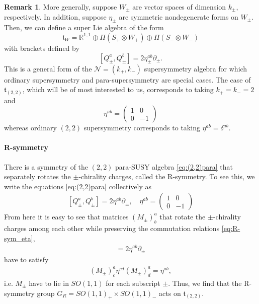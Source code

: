\documentclass[letterpaper,12pt]{article}
\newcommand{\RR}{\mathbb{R}}
\newcommand{\cN}{\mathcal{N}}
\newcommand{\p}{\partial}
\def\tl{\tilde}
\theoremstyle{definition}
\newtheorem{remark}[theorem]{Remark}
\theoremstyle{remark}
\theoremstyle{examples}
\begin{document}
\begin{remark}
\label{rmk: generalsusy}
More generally, suppose $W_\pm$ are vector spaces of dimension $k_\pm$, respectively.
In addition, suppose $\eta_\pm$ are symmetric nondegenerate forms on $W_\pm$. 
Then, we can define a super Lie algebra of the form
\[
\mathfrak{t}_{W} =  \RR^{1,1} \oplus \Pi(S_+ \otimes W_+) \oplus \Pi(S_- \otimes W_-)
\]
with brackets defined by
\[
[Q_\pm^{a}, Q_\pm^{b}] = 2 \eta^{ab}_\pm \partial_\pm .
\] 
This is a general form of the $\cN = (k_+, k_-)$ supersymmetry algebra for which ordinary supersymmetry and para-supersymmetry are special cases.
The case of $\mathfrak{t}_{(2,2)}$, which will be of most interested to us, corresponds to taking $k_+ = k_- = 2$ and 
\[
\eta^{ab}=\begin{pmatrix}
1 & 0 \\
0 & -1
\end{pmatrix}
\]
whereas ordinary $(2,2)$ supersymmetry corresponds to taking $\eta^{ab} = \delta^{ab}$. 

\end{remark}

\paragraph{R-symmetry}
There is a symmetry of the $(2,2)$ para-SUSY algebra \eqref{eq:(2,2)para} that separately rotates the $\pm$-chirality charges, called the R-symmetry. To see this, we write the equations \eqref{eq:(2,2)para} collectively as
\begin{align}\label{eq:R-sym_eta}
[Q_\pm^a,Q_\pm^b]=2\eta^{ab}\p_\pm, \quad 
\eta^{ab}=\begin{pmatrix}
1 & 0 \\
0 & -1
\end{pmatrix}
\end{align}
From here it is easy to see that matrices $(M_\pm)^a_b$ that rotate the $\pm$-chirality charges among each other while preserving the commutation relations \eqref{eq:R-sym_eta},
\begin{align*}
[(M_\pm)^a_cQ_\pm^c,(M_\pm)^b_dQ_\pm^d]=2\eta^{ab}\p_\pm
\end{align*}
have to satisfy
\begin{align}\label{r_symmetry_matrix}
(M_\pm)^a_c\eta^{cd}(M_\pm)^a_d=\eta^{ab},
\end{align}
i.e. $M_\pm$ have to lie in $SO(1,1)$ for each subscript $\pm$. 
Thus, we find that the R-symmetry group $G_R=SO(1,1)_+\times SO(1,1)_-$ acts on $\mathfrak{t}_{(2,2)}$.
\end{document}

